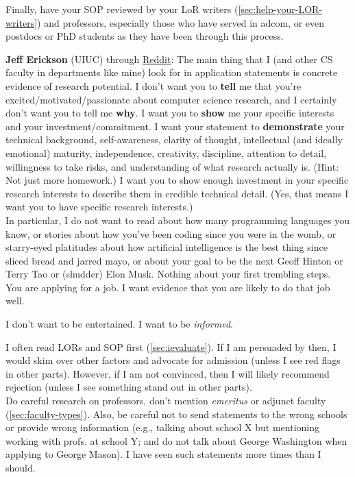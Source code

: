 \documentclass[oneside,11pt]{book}
\newenvironment{commentbox}[1][]{
  \small
  \begin{marker}[\faChessPawn{}]
    {\textbf{#1}}
  }{
  \end{marker}
}
\begin{document}
Finally, have your SOP reviewed by your LoR writers (\autoref{sec:help-your-LOR-writers}) and professors, especially those who have served in adcom, or even postdocs or PhD students as they have been through this process.
\begin{commentbox}{\textbf{Jeff Erickson} (UIUC) through \href{https://www.reddit.com/r/gradadmissions/comments/1owtfgl/comment/nosxvdm/?utm_source=share&utm_medium=web3x&utm_name=web3xcss&utm_term=1&utm_content=share_button}{Reddit}}:
 The main thing that I (and other CS faculty in departments like mine) look for in application statements is concrete evidence of research potential. I don't want you to \textbf{tell} me that you're excited/motivated/passionate about computer science research, and I certainly don't want you to tell me \textbf{why}. I want you to \textbf{show} me your specific interests and your investment/commitment. I want your statement to \textbf{demonstrate} your technical background, self-awareness, clarity of thought, intellectual (and ideally emotional) maturity, independence, creativity, discipline, attention to detail, willingness to take risks, and understanding of what research actually is. (Hint: Not just more homework.) I want you to show enough investment in your specific research interests to describe them in credible technical detail. (Yes, that means I want you to have specific research interests.)
\\

In particular, I do not want to read about how many programming languages you know, or stories about how you've been coding since you were in the womb, or starry-eyed platitudes about how artificial intelligence is the best thing since sliced bread and jarred mayo, or about your goal to be the next Geoff Hinton or Terry Tao or (shudder) Elon Musk. Nothing about your first trembling steps.
\\

You are applying for a job. I want evidence that you are likely to do that job well.

I don't want to be entertained. I want to be \emph{informed}. 
\end{commentbox}
\begin{commentbox}
  I often read LORs and SOP first (\autoref{sec:ievaluate}). If I am
  persuaded by then, I would skim over other factors and advocate for
  admission (unless I see red flags in other parts). However, if I am not
  convinced, then I will likely recommend rejection (unless I see
  something stand out in other parts).\\

  
  Do careful research on professors, don't mention \emph{emeritus} or adjunct faculty (\autoref{sec:faculty-types}).
  Also, be careful not to send statements to the wrong schools or provide wrong information (e.g., talking about school X but mentioning working with
  profs. at school Y; and do not talk about George Washington when applying to George Mason). I have seen such statements more times than I should.
\end{commentbox}
\end{document}

